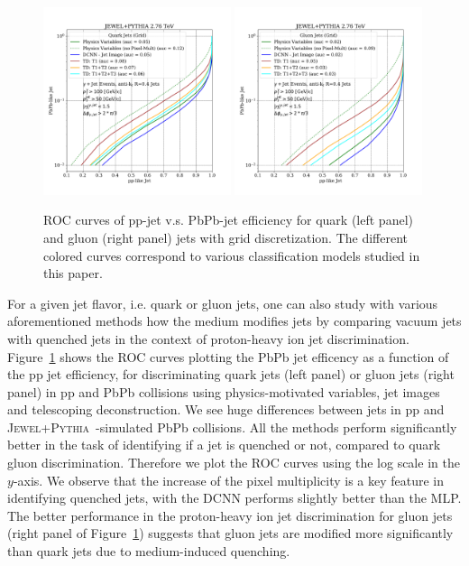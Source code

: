 \documentclass[notoc]{JHEP3}
\newcommand{\jwpy}{\textsc{Jewel+Pythia}~}
\begin{document}
\begin{figure}[t]
	   \centering
	   \includegraphics[width=0.49\textwidth]{plots/JEWELPYTHIA_2p76TeV_quark_ppvspbpb.pdf}
	   \includegraphics[width=0.49\textwidth]{plots/JEWELPYTHIA_2p76TeV_gluon_ppvspbpb.pdf}
	   \caption{ROC curves of pp-jet v.s. PbPb-jet efficiency for quark (left panel) and gluon (right panel) jets with grid discretization. The different colored curves correspond to various classification models studied in this paper.}
\label{fig:ROC_qq_gg}
\end{figure}

For a given jet flavor, i.e. quark or gluon jets, one can also study with various aforementioned methods how the medium modifies jets by comparing vacuum jets with quenched jets in the context of proton-heavy ion jet discrimination. Figure~\ref{fig:ROC_qq_gg} shows the ROC curves plotting the PbPb jet efficency as a function of the pp jet efficiency, for discriminating quark jets (left panel) or gluon jets (right panel) in pp and PbPb collisions using physics-motivated variables, jet images and telescoping deconstruction. We see huge differences between jets in pp and \jwpy-simulated PbPb collisions. All the methods perform significantly better in the task of identifying if a jet is quenched or not, compared to quark gluon discrimination. Therefore we plot the ROC curves using the log scale in the $y$-axis. We observe that the increase of the pixel multiplicity is a key feature in identifying quenched jets, with the DCNN performs slightly better than the MLP. The better performance in the proton-heavy ion jet discrimination for gluon jets (right panel of Figure~\ref{fig:ROC_qq_gg}) suggests that gluon jets are modified more significantly than quark jets due to medium-induced quenching.
\end{document}
